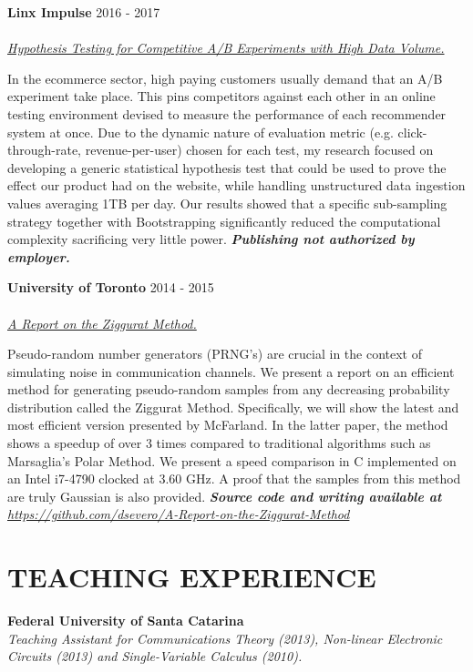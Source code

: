 \documentclass[margin, line]{res}
\begin{document}
\begin{resume}
\textbf{Linx Impulse} \hfill 2016 - 2017\\
\\
\underline{\sl Hypothesis Testing for Competitive A/B Experiments with High Data Volume.}\\
\begin{small}
    In the ecommerce sector, high paying customers usually demand that an A/B experiment take place. This pins competitors against each other in an online testing environment devised to measure the performance of each recommender system at once. Due to the dynamic nature of evaluation metric (e.g. click-through-rate, revenue-per-user) chosen for each test, my research focused on developing a generic statistical hypothesis test that could be used to prove the effect our product had on the website, while handling unstructured data ingestion values averaging 1TB per day. Our results showed that a specific sub-sampling strategy together with Bootstrapping significantly reduced the computational complexity sacrificing very little power. {\sl \textbf{Publishing not authorized by employer.}}
\end{small}

\textbf{University of Toronto} \hfill 2014 - 2015\\
\\
\underline{\sl A Report on the Ziggurat Method.}\\
\begin{small}
    Pseudo-random number generators (PRNG's) are crucial in the context of simulating noise in communication channels. We present a report on an efficient method for generating pseudo-random samples from any decreasing probability distribution called the Ziggurat Method. Specifically, we will show the latest and most efficient version presented by McFarland. In the latter paper, the method shows a speedup of over 3 times compared to traditional algorithms such as Marsaglia's Polar Method. We present a speed comparison in C implemented on an Intel i7-4790 clocked at 3.60 GHz. A proof that the samples from this method are truly Gaussian is also provided. {\sl \textbf{Source code and writing available at} \url{https://github.com/dsevero/A-Report-on-the-Ziggurat-Method}}
\end{small}

\section{TEACHING EXPERIENCE}
\textbf{Federal University of Santa Catarina}\\
{\sl Teaching Assistant for Communications Theory (2013), Non-linear Electronic Circuits (2013) and Single-Variable Calculus (2010).}


\end{resume}
\end{document}
